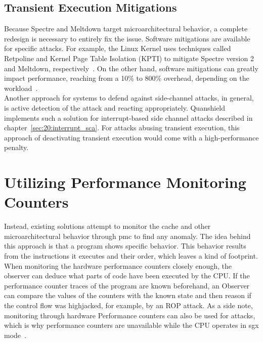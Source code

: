 \subsection{Transient Execution Mitigations}
\label{sec:20:def_sca}
Because Spectre and Meltdown target microarchitectural behavior, a complete
redesign is necessary to entirely fix the issue. Software mitigations are
available for specific attacks. For example, the Linux Kernel uses techniques
called Retpoline and Kernel Page Table Isolation (KPTI) to mitigate Spectre
version 2 and Meltdown, respectively~\cite{retpoline}. On the other hand,
software mitigations can greatly impact performance, reaching from a 10\% to
800\% overhead, depending on the workload~\cite{low2018overview}.\\

Another approach for systems to defend against side-channel attacks, in general,
is active detection of the attack and reacting appropriately. Quanshield
implements such a solution for interrupt-based side channel attacks described in
chapter~\ref{sec:20:interrupt_sca}. For attacks abusing transient execution,
this approach of deactivating transient execution would come with a
high-performance penalty.\\

\section{Utilizing Performance Monitoring Counters}
\label{sec:20:pmc}
Instead, existing solutions attempt to monitor the cache and other
microarchitectural behavior through \gls{pmc} to find any anomaly. The idea
behind this approach is that a program shows specific behavior. This behavior
results from the instructions it executes and their order, which leaves a kind
of footprint. When monitoring the hardware performance counters closely enough,
the observer can deduce what parts of code have been executed by the CPU. If the
performance counter traces of the program are known beforehand, an Observer can
compare the values of the counters with the known state and then reason if the
control flow was highjacked, for example, by an ROP attack. As a side note,
monitoring through hardware Performance counters can also be used for attacks,
which is why performance counters are unavailable while the CPU operates in
\gls{sgx} mode~\cite{uhsadel2008exploiting,costan2016intel}.\\


